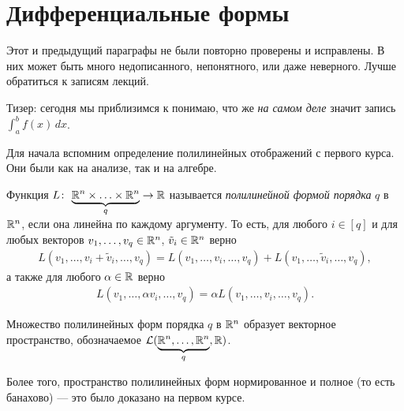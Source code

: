 
\section{Дифференциальные формы}

{\color{red} Этот и предыдущий параграфы не были повторно проверены и исправлены. В них может быть много недописанного, непонятного, или даже неверного. Лучше обратиться к записям лекций.}

Тизер: сегодня мы приблизимся к понимаю, что же \textit{на самом деле} значит запись $\int_{a}^{b} f(x) \, dx $.

Для начала вспомним определение полилинейных отображений с первого курса. Они были как на анализе, так и на алгебре.

\begin{df}
 Функция $L \colon\, \underbrace{\mathbb{R}^{n} \times \ldots \times \mathbb{R}^{n}}_{q} \to \mathbb{R}  $ называется \textit{полилинейной формой порядка} $q$ в $\mathbb{R}^{n}$, если она линейна по каждому аргументу. То есть, для любого $i \in [q]$ и для любых векторов $v_1, \ldots, v_q \in \mathbb{R}^{n}$, $\tilde v_i \in \mathbb{R}^{n}$ верно
 \begin{align*}
  L(v_1, \ldots, v_i + \tilde v_i, \ldots, v_q) = L(v_1, \ldots, v_i, \ldots, v_q) + L(v_1, \ldots, \tilde v_i, \ldots, v_q)
 ,\end{align*} а также для любого $\alpha \in \mathbb{R}$ верно
 \begin{align*}
  L(v_1, \ldots, \alpha v_i, \ldots, v_q) = \alpha L(v_1, \ldots, v_i, \ldots, v_q)
 .\end{align*} 
\end{df}
\begin{prop*}
 Множество полилинейных форм порядка $q$ в $\mathbb{R}^{n}$ образует векторное пространство, обозначаемое $\mathcal{L}(\underbrace{\mathbb{R}^{n}, \ldots, \mathbb{R}^{n}}_{q}, \mathbb{R})$.
\end{prop*}
Более того, пространство полилинейных форм нормированное и полное (то есть банахово) --- это было доказано на первом курсе.

